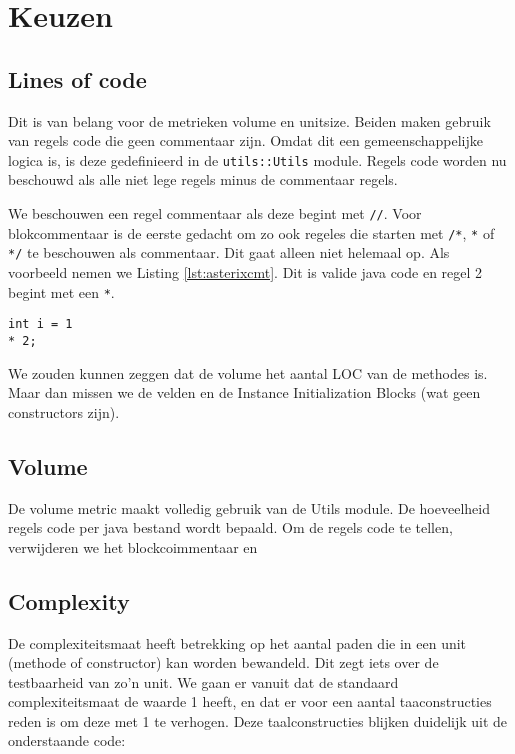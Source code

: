 \documentclass[a4paper]{article}
\begin{document}
\section{Keuzen}
\subsection{Lines of code}
Dit is van belang voor de metrieken volume en unitsize. Beiden maken gebruik van regels code die geen commentaar zijn. Omdat dit een gemeenschappelijke logica is, is deze gedefinieerd in de \texttt{utils::Utils} module.
Regels code worden nu beschouwd als alle niet lege regels minus de commentaar regels.

We beschouwen een regel commentaar als deze begint met \lstinline{//}. Voor blokcommentaar is de eerste gedacht om zo ook regeles die starten met \lstinline{/*}, \lstinline{*} of \lstinline{*/} te beschouwen als commentaar. Dit gaat alleen niet helemaal op. Als voorbeeld nemen we Listing \ref{lst:asterixcmt}. Dit is valide java code en regel 2 begint met een \lstinline{*}.

\begin{lstlisting}[caption={* als commentaar beschouwen},label={lst:asterixcmt},escapechar=|, frame = single]
int i = 1
* 2;
\end{lstlisting}

We zouden kunnen zeggen dat de volume het aantal LOC van de methodes is. Maar dan missen we de velden en de Instance Initialization Blocks (wat geen constructors zijn).

\subsection{Volume}
De volume metric maakt volledig gebruik van de Utils module. De hoeveelheid regels code per java bestand wordt bepaald. Om de regels code te tellen, verwijderen we het blockcoimmentaar en

\subsection{Complexity}
De complexiteitsmaat heeft betrekking op het aantal paden die in een unit (methode of constructor) kan worden bewandeld. Dit zegt iets over de testbaarheid van zo'n unit. We gaan er vanuit dat de standaard complexiteitsmaat de waarde 1 heeft, en dat er voor een aantal taaconstructies reden is om deze met 1 te verhogen. Deze taalconstructies blijken duidelijk uit de onderstaande code:
\end{document}
